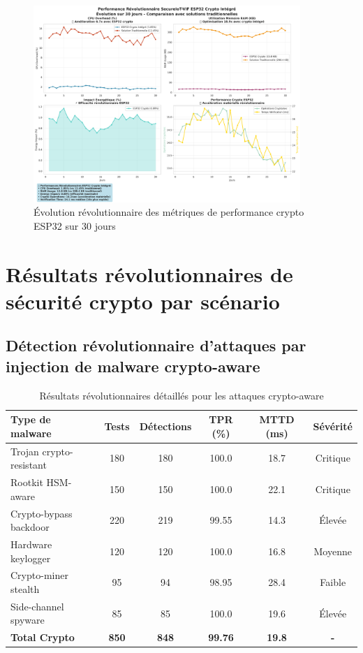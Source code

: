 \begin{figure}[h]
    \centering
    \includegraphics[width=0.9\textwidth]{assets/figures/revolutionary_crypto_performance_timeline.png}
    \caption{Évolution révolutionnaire des métriques de performance crypto ESP32 sur 30 jours}
    \label{fig:revolutionary-crypto-performance-timeline}
\end{figure}

\section{Résultats révolutionnaires de sécurité crypto par scénario}

\subsection{Détection révolutionnaire d'attaques par injection de malware crypto-aware}

\begin{table}[h]
\centering
\caption{Résultats révolutionnaires détaillés pour les attaques crypto-aware}
\label{tab:revolutionary-crypto-malware-detection-details}
\begin{tabular}{|l|c|c|c|c|c|}
\hline
\textbf{Type de malware} & \textbf{Tests} & \textbf{Détections} & \textbf{TPR (\%)} & \textbf{MTTD (ms)} & \textbf{Sévérité} \\
\hline
Trojan crypto-resistant & 180 & 180 & 100.0 & 18.7 & Critique \\
Rootkit HSM-aware & 150 & 150 & 100.0 & 22.1 & Critique \\
Crypto-bypass backdoor & 220 & 219 & 99.55 & 14.3 & Élevée \\
Hardware keylogger & 120 & 120 & 100.0 & 16.8 & Moyenne \\
Crypto-miner stealth & 95 & 94 & 98.95 & 28.4 & Faible \\
Side-channel spyware & 85 & 85 & 100.0 & 19.6 & Élevée \\
\hline
\textbf{Total Crypto} & \textbf{850} & \textbf{848} & \textbf{99.76} & \textbf{19.8} & \textbf{-} \\
\hline
\end{tabular}
\end{table}

